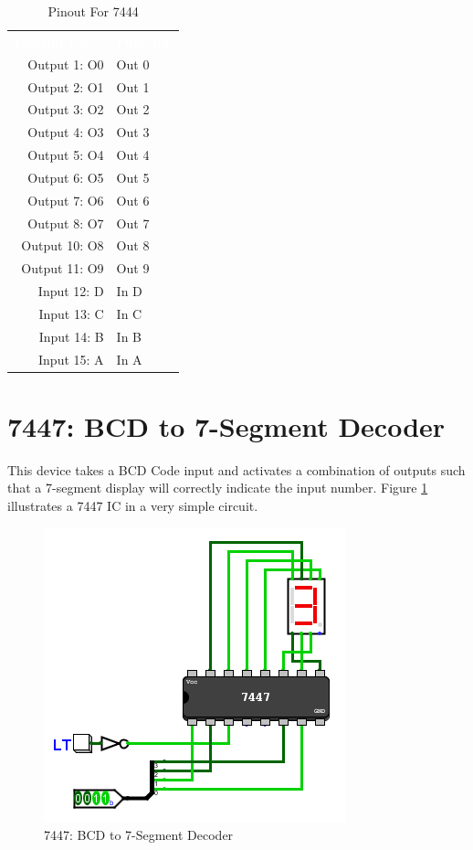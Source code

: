 \begin{table}[H]
	\sffamily
	\newcommand{\head}[1]{\textcolor{white}{\textbf{#1}}}		
	\begin{center}
		\begin{tabular}{rl} 
			\rowcolor{black!75}
			\head{Logisim Label} & \head{Function} \\
			Output 1: O0  & Out 0 \\
			Output 2: O1  & Out 1 \\
			Output 3: O2  & Out 2 \\
			Output 4: O3  & Out 3 \\
			Output 5: O4  & Out 4 \\
			Output 6: O5  & Out 5 \\
			Output 7: O6  & Out 6 \\
			Output 8: O7  & Out 7 \\
			Output 10: O8 & Out 8 \\
			Output 11: O9 & Out 9 \\
			Input 12: D   & In D  \\
			Input 13: C   & In C  \\
			Input 14: B   & In B  \\
			Input 15: A   & In A  \\
		\end{tabular}
	\end{center}
	\caption{Pinout For 7444}
	\label{tab:50-7444b}
\end{table}

\section{7447: BCD to 7-Segment Decoder}

This device takes a BCD Code input and activates a combination of outputs such that a 7-segment display will correctly indicate the input number. Figure \ref{fig:50-7447} illustrates a 7447 \ac{IC} in a very simple circuit.

\begin{figure}[H]
	\centering
	\includegraphics{gfx/50-7447}
	\caption{7447: BCD to 7-Segment Decoder}
	\label{fig:50-7447}
\end{figure}

